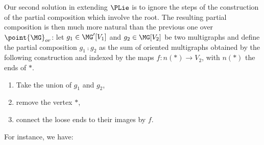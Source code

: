 Our second solution in extending $\PLie$ is to ignore the steps of the construction of the partial 
composition which involve the root. The resulting partial composition is then much more natural than the 
previous one over $\point{\MG}_{or}$: let $g_1\in\MG'[V_1]$ and $g_2\in\MG[V_2]$ be two multigraphs and 
define the partial composition $g_1\comp g_2$ as the sum of oriented multigraphs obtained by the 
following construction and indexed by the maps $f:n(\ast)\to V_2$, with $n(\ast)$ the ends of $\ast$.
\begin{enumerate}
    \item Take the union of $g_1$ and $g_2$,

    \item remove the vertex $\ast$,

    \item connect the loose ends to their images by $f$.
\end{enumerate}
For instance, we have:

